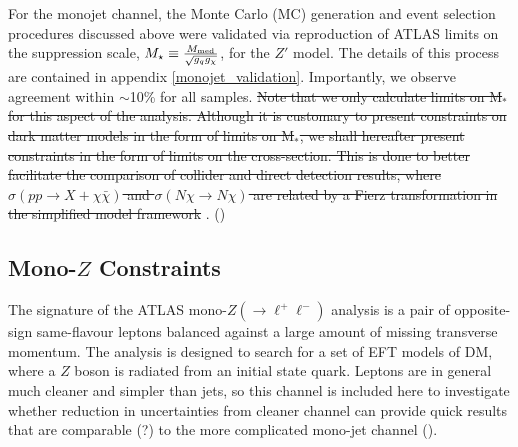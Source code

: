 For the monojet channel, the Monte Carlo (MC) generation and event selection procedures discussed above were validated via reproduction of ATLAS limits on the suppression scale, $M_{\star} \equiv \frac{M_{\mathrm{med}}}{\sqrt{g_q g_{\chi}}}$, for the $Z'$ model. The details of this process are contained in appendix \ref{monojet_validation}. Importantly, we observe agreement within $\sim$10\% for all samples. 
\st{Note that we only calculate limits on M$_{*}$ for this aspect of the analysis. Although it is customary to present constraints on dark matter models in the form of limits on M$_{*}$, we shall hereafter present constraints in the form of limits on the cross-section. This is done to better facilitate the comparison of collider and direct detection results, where $\sigma(pp \rightarrow X + \chi\bar{\chi})$ and $\sigma(N\chi \rightarrow N\chi)$ are related by a Fierz transformation in the simplified model framework} \cite{PJFox, NBellDent}. () 

\subsection{Mono-$Z$ Constraints}
\label{monoZ_constraints}
The signature of the ATLAS mono-$Z(\rightarrow \ell^+ \ell^-)$ analysis \cite{Aad:2014monoZlep} is a pair of opposite-sign same-flavour leptons balanced against a large amount of missing transverse momentum. The analysis is designed to search for a set of EFT models of DM, where a $Z$ boson is radiated from an initial state quark. Leptons are in general much cleaner and simpler than jets, so this channel is included here to investigate whether reduction in uncertainties from cleaner channel can provide quick results that are comparable (?) to the more complicated mono-jet channel (). 

